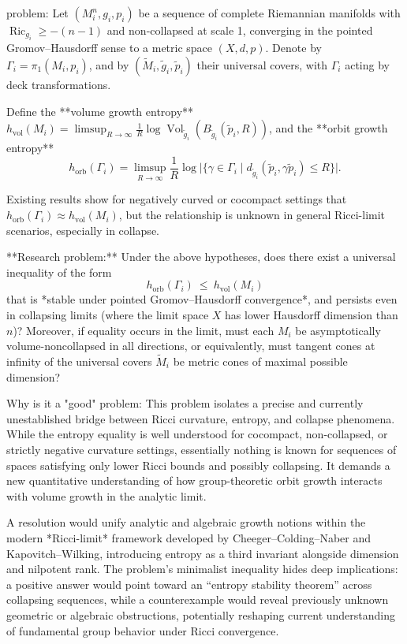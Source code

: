 problem:  
Let \((M_i^n,g_i,p_i)\) be a sequence of complete Riemannian manifolds with \(\operatorname{Ric}_{g_i}\geq -(n-1)\) and non-collapsed at scale 1, converging in the pointed Gromov–Hausdorff sense to a metric space \((X,d,p)\). Denote by \(\Gamma_i = \pi_1(M_i,p_i)\), and by \((\tilde M_i, \tilde g_i, \tilde p_i)\) their universal covers, with \(\Gamma_i\) acting by deck transformations.  

Define the **volume growth entropy** \(h_{\mathrm{vol}}(M_i) = \limsup_{R \to \infty} \frac{1}{R}\log \operatorname{Vol}_{\tilde g_i}(B_{\tilde g_i}(\tilde p_i, R))\), and the **orbit growth entropy**  
\[
h_{\mathrm{orb}}(\Gamma_i) = \limsup_{R\to\infty} \frac{1}{R}\log \Big|\{\gamma\in \Gamma_i\mid d_{\tilde g_i}(\tilde p_i, \gamma \tilde p_i)\le R\}\Big|.
\]

Existing results show for negatively curved or cocompact settings that \(h_{\mathrm{orb}}(\Gamma_i)\approx h_{\mathrm{vol}}(M_i)\), but the relationship is unknown in general Ricci-limit scenarios, especially in collapse.  

**Research problem:**  
Under the above hypotheses, does there exist a universal inequality of the form
\[
h_{\mathrm{orb}}(\Gamma_i)\ \le\ h_{\mathrm{vol}}(M_i)
\]
that is *stable under pointed Gromov–Hausdorff convergence*, and persists even in collapsing limits (where the limit space \(X\) has lower Hausdorff dimension than \(n\))?  
Moreover, if equality occurs in the limit, must each \(M_i\) be asymptotically volume-noncollapsed in all directions, or equivalently, must tangent cones at infinity of the universal covers \(\tilde M_i\) be metric cones of maximal possible dimension?

Why is it a "good" problem:  
This problem isolates a precise and currently unestablished bridge between Ricci curvature, entropy, and collapse phenomena. While the entropy equality is well understood for cocompact, non-collapsed, or strictly negative curvature settings, essentially nothing is known for sequences of spaces satisfying only lower Ricci bounds and possibly collapsing. It demands a new quantitative understanding of how group-theoretic orbit growth interacts with volume growth in the analytic limit.  

A resolution would unify analytic and algebraic growth notions within the modern *Ricci-limit* framework developed by Cheeger–Colding–Naber and Kapovitch–Wilking, introducing entropy as a third invariant alongside dimension and nilpotent rank. The problem’s minimalist inequality hides deep implications: a positive answer would point toward an “entropy stability theorem” across collapsing sequences, while a counterexample would reveal previously unknown geometric or algebraic obstructions, potentially reshaping current understanding of fundamental group behavior under Ricci convergence.